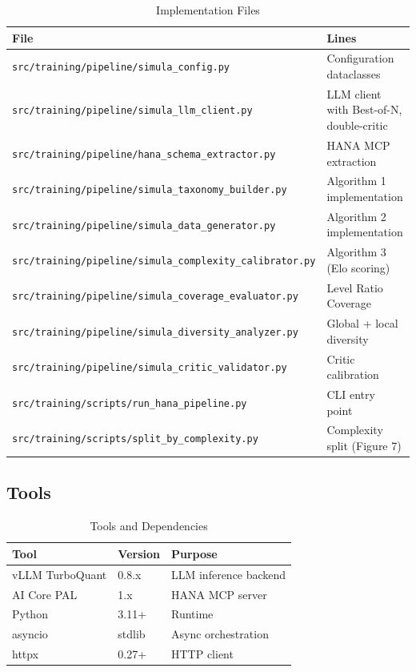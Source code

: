\documentclass[11pt,a4paper]{article}
\begin{document}
\begin{table}[H]
\centering
\caption{Implementation Files}
\begin{tabularx}{\textwidth}{lX}
\toprule
\textbf{File} & \textbf{Lines} \\
\midrule
\texttt{src/training/pipeline/simula\_config.py} & Configuration dataclasses \\
\texttt{src/training/pipeline/simula\_llm\_client.py} & LLM client with Best-of-N, double-critic \\
\texttt{src/training/pipeline/hana\_schema\_extractor.py} & HANA MCP extraction \\
\texttt{src/training/pipeline/simula\_taxonomy\_builder.py} & Algorithm 1 implementation \\
\texttt{src/training/pipeline/simula\_data\_generator.py} & Algorithm 2 implementation \\
\texttt{src/training/pipeline/simula\_complexity\_calibrator.py} & Algorithm 3 (Elo scoring) \\
\texttt{src/training/pipeline/simula\_coverage\_evaluator.py} & Level Ratio Coverage \\
\texttt{src/training/pipeline/simula\_diversity\_analyzer.py} & Global + local diversity \\
\texttt{src/training/pipeline/simula\_critic\_validator.py} & Critic calibration \\
\texttt{src/training/scripts/run\_hana\_pipeline.py} & CLI entry point \\
\texttt{src/training/scripts/split\_by\_complexity.py} & Complexity split (Figure 7) \\
\bottomrule
\end{tabularx}
\end{table}

\subsection{Tools}

\begin{table}[H]
\centering
\caption{Tools and Dependencies}
\begin{tabular}{lll}
\toprule
\textbf{Tool} & \textbf{Version} & \textbf{Purpose} \\
\midrule
vLLM TurboQuant & 0.8.x & LLM inference backend \\
AI Core PAL & 1.x & HANA MCP server \\
Python & 3.11+ & Runtime \\
asyncio & stdlib & Async orchestration \\
httpx & 0.27+ & HTTP client \\
\bottomrule
\end{tabular}
\end{table}
\end{document}
